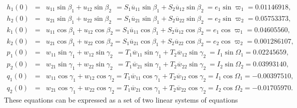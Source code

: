 \documentclass [12pt, a4paper] {article}
\begin{document}
\begin {eqnarray}
    h_1(0) 
    &=& 
    u_{11}\sin\beta_1 + u_{12}\sin\beta_2 
    \:\:
    =
    S_1\overline{u}_{11}\sin\beta_1 + S_2\overline{u}_{12}\sin\beta_2 
    \:
    = 
    e_1\sin\varpi_1
    = 
    0.01146918,
    \\
    h_2(0) 
    &=& 
    u_{21}\sin\beta_1 + u_{22}\sin\beta_2 
    \:\:
    =
    S_1\overline{u}_{21}\sin\beta_1 + S_2\overline{u}_{22}\sin\beta_2 
    \:
    = 
    e_2\sin\varpi_2
    = 
    0.05753373,
    \\
    k_1(0) 
    &=& 
    u_{11}\cos\beta_1 + u_{12}\cos\beta_2 
    =
    S_1\overline{u}_{11}\cos\beta_1 + S_2\overline{u}_{12}\cos\beta_2 
    = 
    e_1\cos\varpi_1
    = 0.04605560,
    \\
    k_2(0) 
    &=& 
    u_{21}\cos\beta_1 + u_{22}\cos\beta_2 
    =
    S_1\overline{u}_{21}\cos\beta_1 + S_2\overline{u}_{22}\cos\beta_2 
    = 
    e_2\cos\varpi_2
    = 0.001286107,
    \\
    p_1(0) 
    &=& 
    w_{11}\sin\gamma_1 + w_{12}\sin\gamma_2 
    \:\:
    =
    T_1\overline{w}_{11}\sin\gamma_1 + T_2\overline{w}_{12}\sin\gamma_2 
    \:
    = 
    I_1\sin\Omega_1
    = 
    0.02245659,
    \\
    p_2(0) 
    &=& 
    w_{21}\sin\gamma_1 + w_{22}\sin\gamma_2 
    \:\:
    =
    T_1\overline{w}_{21}\sin\gamma_1 + T_2\overline{w}_{22}\sin\gamma_2 
    \:
    = 
    I_2\sin\Omega_2
    = 
    0.03993140,
    \\
    q_1(0) 
    &=& 
    w_{11}\cos\gamma_1 + w_{12}\cos\gamma_2 
    =
    T_1\overline{w}_{11}\cos\gamma_1 + T_2\overline{w}_{12}\cos\gamma_2 
    = 
    I_1\cos\Omega_1
    = -0.00397510,
    \\
    q_2(0) 
    &=& 
    w_{21}\cos\gamma_1 + w_{22}\cos\gamma_2 
    =
    T_1\overline{w}_{21}\cos\gamma_1 + T_2\overline{w}_{22}\cos\gamma_2 
    = 
    I_2\cos\Omega_2
    = -0.01705970.
\end {eqnarray}
These equations can be expressed as a set of two linear systems of equations
\end{document}
